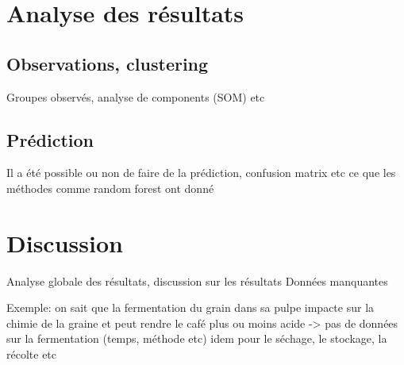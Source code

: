 \chapter{Analyse des résultats}


\section{Observations, clustering}
Groupes observés, analyse de components (SOM) etc

\section{Prédiction}
Il a été possible ou non de faire de la prédiction, confusion matrix etc
ce que les méthodes comme random forest ont donné


\chapter{Discussion}
Analyse globale des résultats, discussion sur les résultats 
Données manquantes

Exemple: on sait que la fermentation du grain dans sa pulpe impacte sur la chimie de la graine et peut rendre le café plus ou moins acide -> pas de données sur la fermentation (temps, méthode etc) idem pour le séchage, le stockage, la récolte etc
